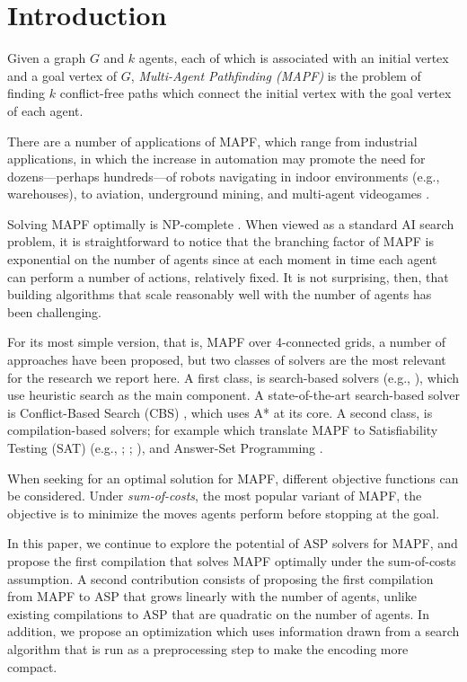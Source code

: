 \section{Introduction}
Given a graph $G$ and $k$ agents, each of which is associated with an initial vertex and a goal vertex of $G$, \emph{Multi-Agent Pathfinding (MAPF)} is the problem of finding $k$ conflict-free paths which connect the initial vertex with the goal vertex of each agent.

There are a number of applications of MAPF, which range from industrial applications, in which the increase in automation may promote the need for dozens---perhaps hundreds---of robots navigating in indoor environments (e.g., warehouses), to aviation, underground mining, and multi-agent videogames \cite{WangB08}.

Solving MAPF optimally is NP-complete \cite{YuL13,MaK17}. When viewed as a standard AI search problem, it is straightforward to notice that the branching factor of MAPF is exponential on the number of agents since at each moment in time each agent can perform a number of actions, relatively fixed. It is not surprising, then, that building algorithms that scale reasonably well with the number of agents has been challenging.

For its most simple version, that is, MAPF over 4-connected grids, a number of approaches have been proposed, but two classes of solvers are the most relevant for the research we report here. A first class, is search-based solvers (e.g., ), which use heuristic search as the main component.
A state-of-the-art search-based solver is Conflict-Based Search (CBS) \cite{SharonSFS12,FelnerLB00KK18,LiFB0K19}, which uses A* at its core. A second class, is compilation-based solvers; for example which translate MAPF to Satisfiability Testing (SAT) (e.g., ; ; ), and Answer-Set Programming \cite{ErdemKOS13,GebserOOS18}.

When seeking for an optimal solution for MAPF, different objective functions can be considered. Under \emph{sum-of-costs}, the most popular variant of MAPF, the objective is to minimize the moves agents perform before stopping at the goal. %

In this paper, we continue to explore the potential of ASP solvers for MAPF, and propose the first compilation that solves MAPF optimally under the sum-of-costs assumption. A second contribution consists of proposing the first compilation from MAPF to ASP that grows linearly with the number of agents, unlike existing compilations to ASP that are quadratic on the number of agents. In addition, we propose an optimization which uses information drawn from a search algorithm that is run as a preprocessing step to make the encoding more compact.

